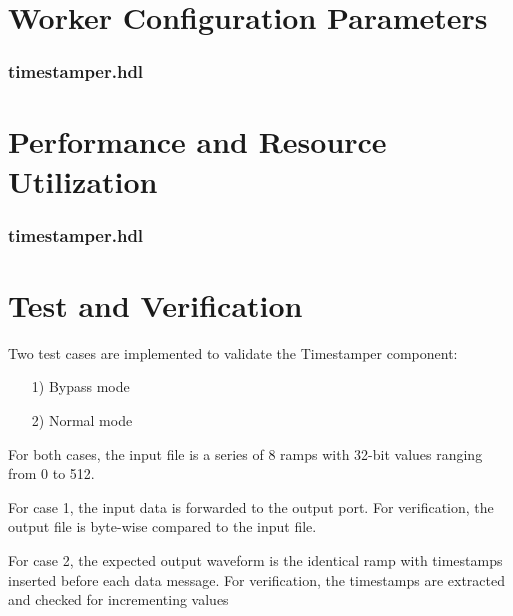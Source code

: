 \documentclass{article}
\def\comp{timestamper}
\edef\ecomp{timestamper}
\def\Comp{Timestamper}
\begin{document}
\begin{landscape}
\section*{Worker Configuration Parameters}
\subsubsection*{\comp.hdl}
%
\section*{Performance and Resource Utilization}
\subsubsection*{\comp.hdl}
%
\end{landscape}
\section*{Test and Verification}
\begin{flushleft}
	Two test cases are implemented to validate the \Comp{} component:
	\begin{itemize}
		\item[1)] Bypass mode
		\item[2)] Normal mode
	\end{itemize}
	For both cases, the input file is a series of 8 ramps with 32-bit values ranging from 0 to 512.\par\medskip
	For case 1, the input data is forwarded to the output port. For verification, the output file is byte-wise compared to the input file.\par\medskip
	For case 2,  the expected output waveform is the identical ramp with timestamps inserted before each data message. For verification, the timestamps are extracted and checked for incrementing values
\end{flushleft}
\end{document}
